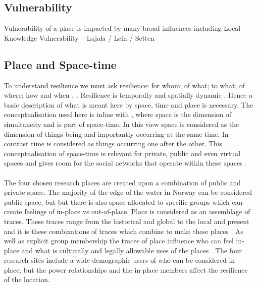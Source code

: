  
 
\subsection{Vulnerability}
Vulnerability of a place is impacted by many broad influences including Local Knowledge 
Vulnerability – Lujala / Lein / Setten 



\subsection{Place and Space-time} 
To understand resilience we must ask resilience: for whom; of what; to what; of where; how and when \cite{cutter_community_2020}, \cite{moser_turbulent_2019}. Resilience is temporally and spatially dynamic \cite{cutter_community_2020}. Hence a basic description of what is meant here by space, time and place is necessary. The conceptualisation used here is inline with \cite{massey_for_2005}, where space is the dimension of simultaneity and is part of space-time. In this view space is considered as the dimension of things being and importantly occurring at the same time. In contrast time is considered as things occurring one after the other. This conceptualisation of space-time is relevant for private, public and even virtual spaces and gives room for the social networks that operate within these spaces \cite{massey_for_2005} \cite{allen_rethinking_1998}.

\paragraph{}
The four chosen research places are created upon a combination of public and private space. The majority of the edge of the water in Norway can be considered public space, but but there is also space allocated to specific groups which can create feelings of in-place vs out-of-place. Place is considered as an assemblage of traces. These traces range from the historical and global to the local and present and it is these combinations of traces which combine to make these places \cite{anderson_understanding_2015} \cite{massey_for_2005}. As well as explicit group membership the traces of place influence who can feel in-place and what is culturally and legally allowable uses of the places \cite{anderson_understanding_2015}. The four research sites include a wide demographic users of who can be considered in-place, but the power relationships and the in-place members affect the resilience of the location. 

